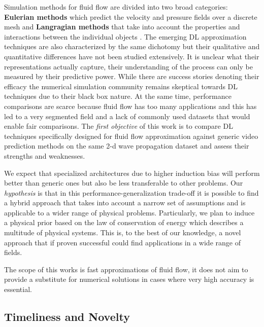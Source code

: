 \documentclass[a4paper,11pt]{article}
\begin{document}
Simulation methods for fluid flow are divided into two broad categories:  \textbf{Eulerian methods} which predict the velocity and pressure fields over a discrete mesh and \textbf{Langragian methods} that take into account the properties and interactions between the individual objects \cite{zhang2007comparison}. The emerging DL approximation techniques are also characterized by the same dichotomy but their qualitative and quantitative differences have not been studied extensively. It is unclear what their representations actually capture, their understanding of the process can only be measured by their predictive power. While there are success stories denoting their efficacy \cite{tompson2017accelerating} the numerical simulation community remains skeptical towards DL techniques due to their black box nature. At the same time, performance comparisons are scarce because fluid flow has too many applications and this has led to a very segmented field and a lack of commonly used datasets that would enable fair comparisons. The \textit{first objective} of this work is to compare DL techniques specifically designed for fluid flow approximation against generic video prediction methods on the same 2-d wave propagation dataset and assess their strengths and weaknesses.

We expect that specialized architectures due to higher induction bias will perform better than generic ones but also be less transferable to other problems. Our \textit{hypothesis} is that in this performance-generalization trade-off it is possible to find a hybrid approach that takes into account a narrow set of assumptions and is applicable to a wider range of physical problems. Particularly, we plan to induce a physical prior based on the law of conservation of energy which describes a multitude of physical systems. This is, to the best of our knowledge, a novel approach that if proven successful could find applications in a wide range of fields. 

The scope of this works is fast approximations of fluid flow, it does not aim to provide a substitute for numerical solutions in cases where very high accuracy is essential.

\subsection{Timeliness and Novelty}
\end{document}
